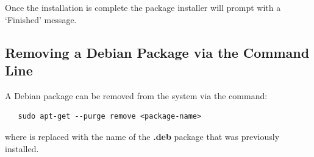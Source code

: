 \documentclass[12pt]{article}
\begin{document}
Once the installation is complete the package installer will prompt with a `{\sf Finished}' message.

\subsection*{Removing a Debian Package via the Command Line}

A Debian package can be removed from the system via the command:
\begin{verbatim}
   sudo apt-get --purge remove <package-name>
\end{verbatim}
where {\tt <package-name>} is replaced with the name of the {\bf .deb} package that was previously installed. 
\end{document}
